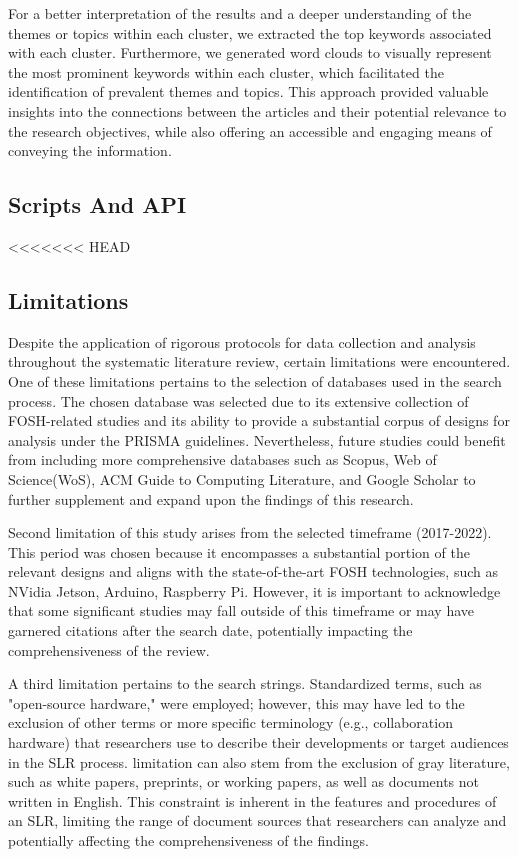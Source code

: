 \documentclass[final-report.tex]{subfiles}
\begin{document}
For a better interpretation of the results and a deeper understanding of the themes or topics within each cluster, we extracted the top keywords associated with each cluster. 
Furthermore, we generated word clouds to visually represent the most prominent keywords within each cluster, which facilitated the identification of prevalent themes and topics. 
This approach provided valuable insights into the connections between the articles and their potential relevance to the research objectives, while also offering an accessible and engaging means of conveying the information.

\subsection{Scripts And API}

<<<<<<< HEAD
\subsection{Limitations}

Despite the application of rigorous protocols for data collection and analysis throughout the systematic literature review, certain limitations were encountered. One of these limitations pertains to the selection of databases used in the search process. The chosen database was selected due to its extensive collection of FOSH-related studies and its ability to provide a substantial corpus of designs for analysis under the PRISMA guidelines. Nevertheless, future studies could benefit from including more comprehensive databases such as Scopus, Web of Science(WoS), ACM Guide to Computing Literature, and Google Scholar to further supplement and expand upon the findings of this research.

Second limitation of this study arises from the selected timeframe (2017-2022). This period was chosen because it encompasses a substantial portion of the relevant designs and aligns with the state-of-the-art FOSH technologies, such as NVidia Jetson, Arduino, Raspberry Pi. However, it is important to acknowledge that some significant studies may fall outside of this timeframe or may have garnered citations after the search date, potentially impacting the comprehensiveness of the review.

A third limitation pertains to the search strings. Standardized terms, such as "open-source hardware," were employed; however, this may have led to the exclusion of other terms or more specific terminology (e.g., collaboration hardware) that researchers use to describe their developments or target audiences in the SLR process.
limitation can also stem from the exclusion of gray literature, such as white papers, preprints, or working papers, as well as documents not written in English. This constraint is inherent in the features and procedures of an SLR, limiting the range of document sources that researchers can analyze and potentially affecting the comprehensiveness of the findings.
\end{document}
